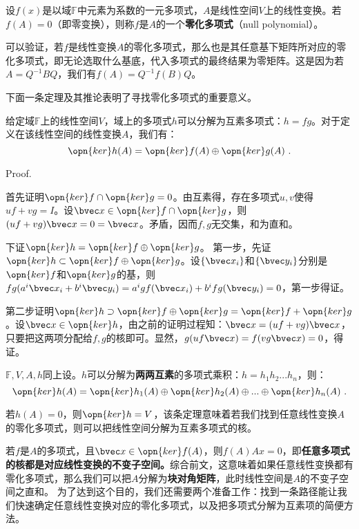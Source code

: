 


\begin{definition}{}
设$f(x)$是以域$\mathbb F$中元素为系数的一元多项式，$A$是线性空间$V$上的线性变换。若$f(A)=0$（即零变换），则称$f$是$A$的一个\textbf{零化多项式}（null polynomial）。
\end{definition}
可以验证，若$f$是线性变换$A$的零化多项式，那么也是其任意基下矩阵所对应的零化多项式，即无论选取什么基底，代入多项式的最终结果为零矩阵。这是因为若$A=Q^{-1}BQ$，我们有$f(A)=Q^{-1}f(B)Q$。


下面一条定理及其推论表明了寻找零化多项式的重要意义。
\begin{theorem}{}
给定域$\mathbb F$上的线性空间$V$，域上的多项式$h$可以分解为互素多项式：$h=fg$。对于定义在该线性空间的线性变换$A$，我们有：
\begin{equation}
\opn{ker}h(A)=\opn{ker}f(A)\oplus\opn{ker}g(A)~.
\end{equation}
\end{theorem}
Proof.

首先证明$\opn{ker}f\cap \opn{ker}g=0$。由互素得，存在多项式$u,v$使得$uf+vg=I$。设$\bvec x\in \opn{ker}f\cap \opn{ker}g$，则$(uf+vg)\bvec x=0=\bvec x$。矛盾，因而$f,g$无交集，和为直和。

下证$\opn{ker}h=\opn{ker}f\oplus\opn{ker}g$。
第一步，先证$\opn{ker}h\subset\opn{ker}f\oplus\opn{ker}g$。设$\{\bvec x_i\}$和$\{\bvec y_i\}$分别是$\opn{ker}f$和$\opn{ker}g$的基，则$fg(a^i\bvec x_i+b^i \bvec y_i)=a^igf(\bvec x_i)+b^ifg(\bvec y_i)=0$，第一步得证。

第二步证明$\opn{ker}h\supset\opn{ker}f\oplus\opn{ker}g=\opn{ker}f+\opn{ker}g$。设$\bvec x\in \opn{ker}h$，由之前的证明过程知：$\bvec x=(uf+vg)\bvec x$，只要把这两项分配给$f,g$的核即可。显然，$g(uf\bvec x)=f(vg\bvec x) =0$，得证。

\begin{corollary}{}\label{cor_nullpl_1}
$\mathbb F,V,A,h$同上设。$h$可以分解为\textbf{两两互素}的多项式乘积：$h=h_1h_2...h_n$，则：
\begin{equation}
\opn{ker}h(A)=\opn{ker}h_1(A)\oplus\opn{ker}h_2(A)\oplus...\oplus\opn{ker}h_n(A)~.
\end{equation}
\end{corollary}

若$h(A)=0$，则$\opn{ker} h=V$，该条定理意味着若我们找到任意线性变换$A$的零化多项式，则可以把线性空间分解为互素多项式的核。

若$f$是$A$的多项式，且$\bvec x\in \opn{ker}f(A)$，则$f(A)A x=0$，即\textbf{任意多项式的核都是对应线性变换的不变子空间。}综合前文，这意味着如果任意线性变换都有零化多项式，那么我们可以把$A$分解为\textbf{块对角矩阵}，此时线性空间是$A$的不变子空间之直和。
为了达到这个目的，我们还需要两个准备工作：找到一条路径能让我们快速确定任意线性变换对应的零化多项式，以及把多项式分解为互素项的简便方法。


